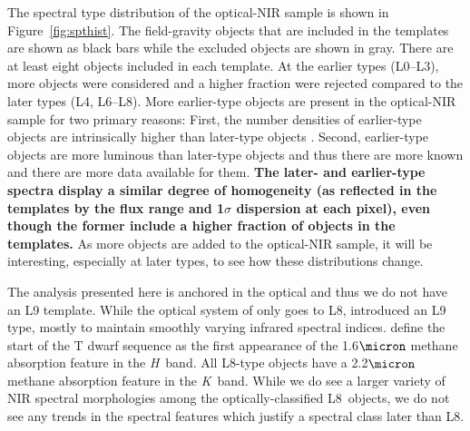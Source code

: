 \documentclass[12pt]{aastex6}
\begin{document}
The spectral type distribution of the optical-NIR sample is shown in Figure~\ref{fig:spthist}.
The field-gravity objects that are included in the templates are shown as black bars while the excluded objects are shown in gray.
There are at least eight objects included in each template.
At the earlier types (L0--L3), more objects were considered and a higher fraction were rejected compared to the later types (L4, L6--L8).
More earlier-type objects are present in the optical-NIR sample for two primary reasons: First, the number densities of earlier-type objects are intrinsically higher than later-type objects \citep{Cruz03,Reid08,DayJones:2013hm}.
Second, earlier-type objects are more luminous than later-type objects and thus there are more known and there are more data available for them.
\textbf{The later- and earlier-type spectra display a similar degree of homogeneity (as reflected in the templates by the flux range and 1$\sigma$ dispersion at each pixel), even though the former include a higher fraction of objects in the templates.}
As more objects are added to the optical-NIR sample, it will be interesting, especially at later types, to see how these distributions change.

The analysis presented here is anchored in the optical and thus we do not have an L9 template.
While the optical system of \cite{K99} only goes to L8, \cite{Geballe02} introduced an L9 type, mostly to maintain smoothly varying infrared spectral indices.
\cite{Geballe02} define the start of the T dwarf sequence as the first appearance of the 1.6$\micron$ methane absorption feature in the \emph{H}~band.
All L8-type objects have a 2.2$\micron$ methane absorption feature in the \emph{K}~band.
While we do see a larger variety of NIR spectral morphologies among the optically-classified L8~objects, we do not see any trends in the spectral features which justify a spectral class later than L8.
\end{document}

